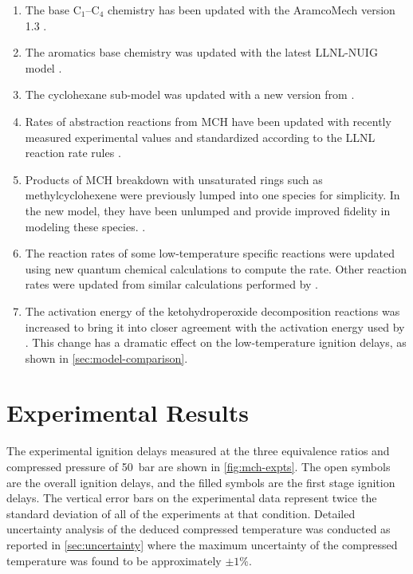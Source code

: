 \documentclass[../main.tex]{subfiles}
\begin{document}
\begin{enumerate}
    \item The base C$_1$--C$_4$ chemistry has been updated with the AramcoMech
        version 1.3 \cite{Metcalfe2013}.
    \item The aromatics base chemistry was updated with the latest LLNL-NUIG
        model \cite{Nakamura2014}.
    \item The cyclohexane sub-model was updated with a new version from
        \textcite{Silke2007}.
    \item Rates of abstraction reactions from MCH have been updated
        with recently measured experimental values \cite{Sivaramakrishnan2009}
        and standardized according to the LLNL reaction rate rules \cite{Sarathy2011b}.
    \item Products of MCH breakdown with unsaturated rings such as
        methylcyclohexene were previously lumped into one species for
        simplicity. In the new model, they have been unlumped and
        provide improved fidelity in modeling these species. \cite{Pitz2013}.
    \item The reaction rates of some low-temperature specific reactions were
        updated using new quantum chemical calculations to compute the rate.
        Other reaction rates were updated from similar calculations performed
        by \textcite{Fernandes2009}.
    \item The activation energy of the ketohydroperoxide decomposition
        reactions was increased to bring it into closer agreement with
        the activation energy used by \textcite{Metcalfe2013}. This change
        has a dramatic effect on the low-temperature ignition delays, as shown
        in \cref{sec:model-comparison}.
\end{enumerate}

\section{Experimental Results}
\label{sec:mch-expts}

The experimental ignition delays measured at the three equivalence ratios and
compressed pressure of \SI{50}{\bar} are shown in \cref{fig:mch-expts}. The open symbols are the
overall ignition delays, and the filled symbols are the first stage ignition
delays. The vertical error bars on the experimental data represent twice the
standard deviation of all of the experiments at that condition. Detailed
uncertainty analysis of the deduced compressed temperature was conducted as
reported in \cref{sec:uncertainty} where the maximum uncertainty of the compressed
temperature was found to be approximately $\pm 1\%$.
\end{document}

